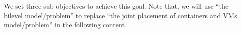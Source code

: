 We set three sub-objectives to achieve this goal. 
Note that, we will use ``the bilevel model/problem'' to replace ``the joint placement of containers and VMs model/problem'' in the following content. 

